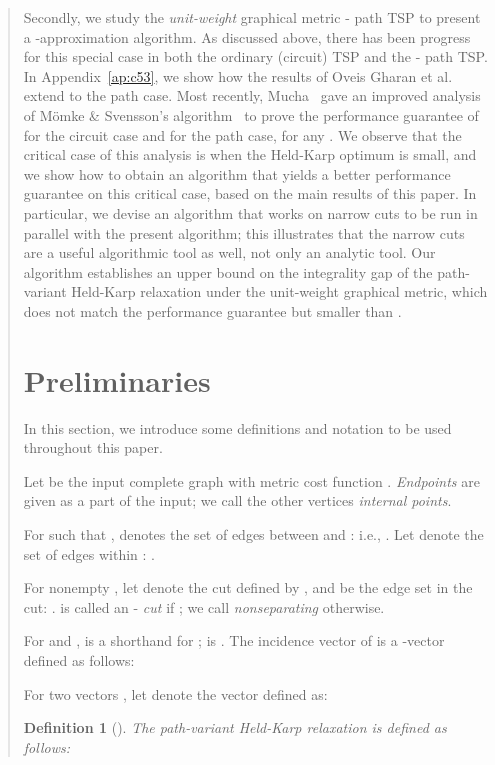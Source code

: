 \documentclass[11pt,letterpaper]{article}
\newtheorem{defn}{Definition}
\newcommand{\st}{\mbox{-} }
\begin{document}
\begin{quote}
Secondly, we study the \emph{unit-weight} graphical metric \st path TSP to present a -approximation algorithm. As discussed above, there has been progress for this special case in both the ordinary (circuit) TSP and the \st path TSP. In Appendix~\ref{ap:c53}, we show how the results of Oveis Gharan et al.~\cite{OSS} extend to the path case. Most recently, Mucha~\cite{M} gave an improved analysis of M\"omke \& Svensson's algorithm~\cite{MS} to prove the performance guarantee of  for the circuit case and  for the path case, for any . We observe that the critical case of this analysis is when the Held-Karp optimum is small, and we show how to obtain an algorithm that yields a better performance guarantee on this critical case, based on the main results of this paper. In particular, we devise an algorithm that works on narrow cuts to be run in parallel with the present algorithm; this illustrates that the narrow cuts are a useful algorithmic tool as well, not only an analytic tool. Our algorithm establishes an upper bound on the integrality gap of the path-variant Held-Karp relaxation under the unit-weight graphical metric, which does not match the performance guarantee but smaller than .

\section{Preliminaries}\label{s:pre}

In this section, we introduce some definitions and notation to be used throughout this paper.

Let  be the input complete graph with metric cost function . \emph{Endpoints}  are given as a part of the input; we call the other vertices \emph{internal points}.

For  such that ,  denotes the set of edges between  and : i.e., . Let  denote the set of edges within : .

For nonempty , let  denote the cut defined by , and  be the edge set in the cut: .  is called an \st \emph{cut} if ; we call  \emph{nonseparating} otherwise.

For  and ,  is a shorthand for ;  is . The incidence vector  of  is a -vector defined as follows:

For two vectors , let  denote the vector defined as:

\begin{defn}[\cite{HK}]
\label{d:hkpath}
The \emph{path-variant Held-Karp relaxation} is defined as follows:
\end{defn}


\end{quote}
\end{document}
